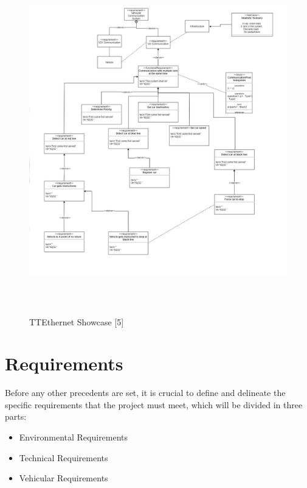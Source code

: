 \documentclass[conference]{IEEEtran}
\begin{document}
\begin{figure}[h!]
	\includegraphics[width=16cm, height=15cm]{Requirement_Diagram}
	\caption{TTEthernet Showcase [5]}
	\centering
\end{figure}
\section{Requirements}
Before any other precedents are set, it is crucial to define and delineate the specific requirements that the project must meet, which will be divided in three parts:
\begin{itemize}
	\item Environmental Requirements
	\item Technical Requirements
	\item Vehicular Requirements
\end{itemize} 
\end{document}
